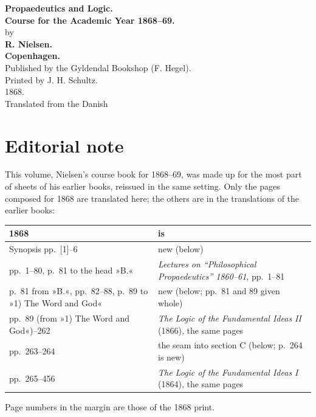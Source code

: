 \documentclass[12pt,a4paper,openany]{book}
\begin{document}
\begin{titlepage}
\begin{center}
\vspace*{4em}
{\Huge\textbf{Propaedeutics and Logic.}}\\[2em]
{\Large\textbf{Course for the Academic Year 1868--69.}}\\[3em]
{\small by}\\[1em]
{\Large\textbf{R. Nielsen.}}\\[8em]
{\small\textbf{Copenhagen.}}\\[0.5em]
{\small Published by the Gyldendal Bookshop (F. Hegel).}\\[0.5em]
{\footnotesize Printed by J. H. Schultz.}\\[0.5em]
1868.\\[3em]
{\small Translated from the Danish}
\end{center}
\end{titlepage}

\chapter*{Editorial note}
{\small This volume, Nielsen's course book for 1868--69, was made up for the most part of sheets of his earlier books,
reissued in the same setting.  Only the pages composed for 1868 are translated here; the others are in the
translations of the earlier books:
\begin{center}
\begin{tabular}{ll}
1868 & is \\ \hline
Synopsis pp.~[1]--6 & new (below) \\
pp.~1--80, p.~81 to the head »B.« & \emph{Lectures on ``Philosophical Propaedeutics'' 1860--61}, pp.~1--81 \\
p.~81 from »B.«, pp.~82--88, p.~89 to »1) The Word and God« & new (below; pp.~81 and 89 given whole) \\
pp.~89 (from »1) The Word and God«)--262 & \emph{The Logic of the Fundamental Ideas II} (1866), the same pages \\
pp.~263--264 & the seam into section C (below; p.~264 is new) \\
pp.~265--456 & \emph{The Logic of the Fundamental Ideas I} (1864), the same pages \\
\end{tabular}
\end{center}
Page numbers in the margin are those of the 1868 print.\par}
\end{document}
